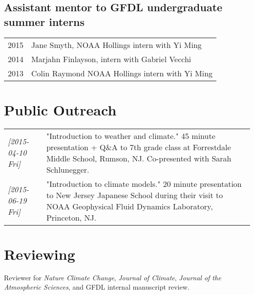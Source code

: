 \documentclass{article}
\begin{document}
\subsection*{Assistant mentor to GFDL undergraduate summer interns}
\label{sec:orgheadline17}
\begin{center}
\begin{tabularx}{\textwidth}{lX}
2015 & Jane Smyth, NOAA Hollings intern with Yi Ming\\
2014 & Marjahn Finlayson, intern with Gabriel Vecchi\\
2013 & Colin Raymond NOAA Hollings intern with Yi Ming\\
\end{tabularx}
\end{center}
\section*{Public Outreach}
\label{sec:orgheadline19}
\begin{center}
\begin{tabularx}{\textwidth}{lX}
\textit{[2015-04-10 Fri]} & "Introduction to weather and climate."  45 minute presentation + Q\&A to 7th grade class at Forrestdale Middle School, Rumson, NJ.  Co-presented with Sarah Schlunegger.\\
\textit{[2015-06-19 Fri]} & "Introduction to climate models."  20 minute presentation to New Jersey Japanese School during their visit to NOAA Geophysical Fluid Dynamics Laboratory, Princeton, NJ.\\
\end{tabularx}
\end{center}
\section*{Reviewing}
\label{sec:orgheadline20}
Reviewer for \emph{Nature Climate Change}, \emph{Journal of Climate}, \emph{Journal of the
Atmospheric Sciences}, and GFDL internal manuscript review.
\end{document}
